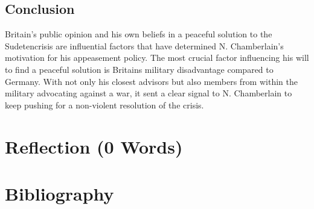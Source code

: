 \documentclass[10pt, a4papert, hidelinks]{article}
\begin{document}
\subsection{Conclusion}


Britain's public opinion and his own beliefs in a peaceful solution to the Sudetencrisis are influential factors that have determined N. Chamberlain's motivation for his appeasement policy. The most crucial factor influencing his will to find a peaceful solution is Britains military disadvantage compared to Germany. With not only his closest advisors but also members from within the military advocating against a war, it sent a clear signal to N. Chamberlain to keep pushing for a non-violent resolution of the crisis.

\section{Reflection (0 Words)}


\newpage
\section{Bibliography}
\printbibliography[heading=none]
\end{document}
